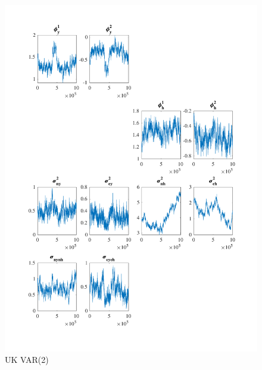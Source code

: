 \documentclass[
  12pt,
]{article}
\begin{document}
\begin{figure}

{\centering \includegraphics[width=0.85\linewidth]{../../Regression/Bayesian_UC_VAR2_nodrift/OutputData/posteriorchain_GB} 

}

\caption{UK VAR(2)}\label{fig:unnamed-chunk-15}
\end{figure}
\end{document}
